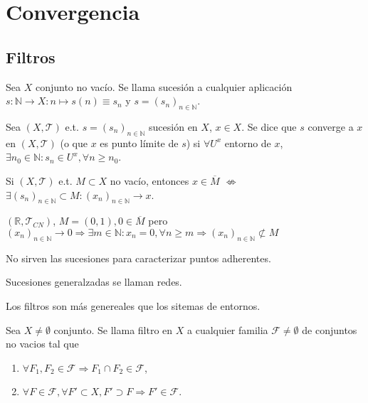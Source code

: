 \chapter{Convergencia}

\section{Filtros}

\begin{defn}[Sucesión]
  Sea $X$ conjunto no vacío. Se llama sucesión a cualquier aplicación $s : \mathbb{N} \to X : n \mapsto s(n) \equiv s_{n}$ y $s = (s_{n})_{n \in \mathbb{N}}$.
\end{defn}

\begin{defn}
  Sea $( X, \mathcal{T} )$ e.t. $s = ( s_{n} )_{n \in \mathbb{N}}$ sucesión en $X$, $x \in X$. Se dice que $s$ converge a $x$ en $( X, \mathcal{T} )$ (o que $x$ es punto límite de $s$) si $\forall U^{x}$ entorno de $x$, $\exists n_{0} \in \mathbb{N} : s_{n} \in U^{x}, \forall n \geq n_{0}$. 
\end{defn}

\begin{obs}
  Si $( X, \mathcal{T} )$ e.t. $M \subset X$ no vacío, entonces $x \in \overline{M}$ $\not \Leftrightarrow$ $\exists ( s_{n} )_{n \in \mathbb{N}} \subset M : ( x_{n} )_{n \in \mathbb{N}} \rightarrow x$.
\end{obs}

\begin{ejm}
  $( \mathbb{R}, \mathcal{T}_{CN} )$, $M = ( 0, 1), 0 \in \overline{M}$ pero $( x_{n} )_{n \in \mathbb{N}} \rightarrow 0 \Rightarrow \exists m \in \mathbb{N} : x_{n} = 0, \forall n \geq m \Rightarrow ( x_{n} )_{n \in \mathbb{N}} \not \subset M$
\end{ejm}

\begin{obs}
  No sirven las sucesiones para caracterizar puntos adherentes.
\end{obs}

\begin{obs}
  Sucesiones generalzadas se llaman redes.
\end{obs}

\begin{obs}
  Los filtros son más genereales que los sitemas de entornos.
\end{obs}

\begin{defn}[Filtro]
  Sea $X \neq \emptyset$ conjunto. Se llama filtro en $X$ a cualquier familia $\mathcal{F} \neq \emptyset$ de conjuntos no vacios tal que
  \begin{enumerate}[label=(\roman*)]
    \item $\forall F_{1}, F_{2} \in \mathcal{F} \Rightarrow F_{1} \cap F_{2} \in \mathcal{F}$,
    \item $\forall F \in \mathcal{F}, \forall F' \subset X, F' \supset F \Rightarrow F' \in \mathcal{F}$.
  \end{enumerate}
\end{defn}

